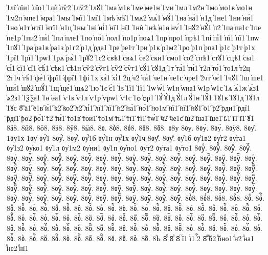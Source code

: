 {҆1лї
҆лїи1
҆лїо1
҆1лѝ
҆лѷ2
҆1лѷ2
҆1лꙋ1
҆1ма
҆м1в
҆1ме
҆ме1н
҆1ми
҆1мл
҆1м2н
҆1мо
҆мо1в
҆мо1н
҆1м2п
҆мпе1
҆мра1
҆1мы
҆1мї1
҆1мї1
҆1мѣ
҆мѣ̑1
҆1мѧ2
҆мѧ́1
҆мꙋ́1
҆1на
҆на́1
҆н1д
҆1не1
҆1ни
҆ни́1
҆1но
҆н1т
҆нтї1
҆нтї1
҆н1ц
҆1ны
҆1ні
҆ні́1
҆нї1
҆нї1
҆1нѝ
҆1нѣ
҆н1ѳ
҆нѵ́1
҆1нꙋ2
҆нꙋ́1
҆п2
҆1па
҆па1с
҆1пе
҆пе1р
҆1пи2
҆пи́1
҆1пл
҆пле1
҆1по
҆по́1
҆пол1
҆по1р
҆поѧ1
҆1пр
҆про1
҆прѣ1
҆1пі
҆пі́1
҆пї1
҆пї1
҆1пѡ
҆1пꙋ1
҆1ра
҆ра1в
҆ра1з
҆р1г2
҆р1д
҆рда1
҆1ре
҆ре1т
҆1ри
҆р1к
҆р1м2
҆1ро
҆р1п
҆рпа1
҆р1с
҆р1т
҆р1х
҆1рї1
҆1рї1
҆1рѡ1
҆1рѧ
҆рѧ́1
҆1рꙋ2
҆1с2
҆свѣ1
҆свѧ1
҆се2
҆ски1
҆смо1
҆со2
҆спѣ1
҆стꙋ1
҆сцѣ1
҆сы1
҆сі́1
҆сї1
҆сї1
҆сѣ́1
҆сѣк1
҆сѣ1н
҆сѷ2
҆сѷг1
҆сѷ2
҆сѷг1
҆сꙋ́1
҆сꙋ1д
҆1т
҆та́1
҆ти́1
҆т2л
҆то́1
҆то1л
҆т2ц
҆2т1ч
҆тѣ́1
҆фе́1
҆фрї1
҆фрї1
҆1фі
҆1х
҆ха́1
҆хі́1
҆2ц
҆ч2
҆ча́1
҆че1н
҆че1с
҆чре1
҆2чт
҆чє́1
҆1чꙋ1
҆1ш
҆ше1
҆ши́1
҆шꙋ2
҆шꙋ́1
҆1щ
҆ще́1
҆щѧ2
҆1ю
҆1є
҆є́1
҆1ѕ
҆1ї1
҆1ї1
҆1ѡ
҆ѡ́1
҆ѡ1н
҆ѡна1
҆ѡ1р
҆ѡ1с
҆1ѧ
҆ѧ́1ж
҆ѧ́з1
҆ѧ2з1
҆1ѯ
҆ѯа1
҆1ѳ
҆ѳа1
҆ѵ1к
҆ѵ1л
҆ѵ1р
҆ѵрѡ1
҆ѵ1с
҆1ѻ
҆ѻр1
҆1ꙋ́
҆ꙋ́1д
҆ꙋ́1л
҆ꙋ́1н
҆1ꙋ̑1
҆1ꙋ1в
҆1ꙋ1д
҆1ꙋ1л
҆1ꙋс
8҇
҇а1
҇е1в
҇и́1
҇к2
҇ко2
҇л2
҇лі́1
҇лї1
҇лї1
҇н2
҇на́1
҇но́1
҇но1м
҇нї1
҇нї1
҇нꙋ1
҇о1
҇р2
҇рди1
҇рдї1
҇рдї1
҇ро2
҇ро́1
҇т2
҇ти́1
҇то1в
҇тои1
҇то1м
҇ть1
҇тї1
҇тї1
҇тѡ́1
҇ч2
҇че1с
҇ш2
҇ша1
҇ше1
҇ь1
҇ї1
҇ї1
҇ꙋ1
8ӓ8.
8ӥ8.
8ӧ8.
8ӭ8.
8ӱ8.
8ӹ8.
8ᲂ.
8ᲂ̀8.
8ᲂ́8.
8ᲂ̈8.
8ᲂ̑8.
ᲂ8у
8ᲂу.
8ᲂу̀.
8ᲂу́.
8ᲂӱ8.
8ᲂу̑.
1ᲂу1х
1ᲂу҆
ᲂу҆̀1
8ᲂу҆̀.
8ᲂу҆́.
ᲂу҆́1б
ᲂу҆́1н
ᲂу҆́1х
ᲂу҆́1ч
8ᲂу҆̈.
8ᲂу҆̑.
ᲂу҆1б
ᲂу҆1в2
ᲂу҆г2
ᲂу҆га1
ᲂу҆1з2
ᲂу҆ко1
ᲂу҆1л
ᲂу҆1м2
ᲂу҆ни1
ᲂу҆1п
ᲂу҆по1
ᲂу҆т2
ᲂу҆та1
ᲂу҆то1
8ᲂуⷠ.
8ᲂуⷠ҇.
8ᲂуⷡ.
8ᲂуⷡ҇.
8ᲂуⷢ.
8ᲂуⷢ҇.
8ᲂуⷣ.
8ᲂуⷣ҇.
8ᲂуⷤ.
8ᲂуⷤ҇.
8ᲂуⷥ.
8ᲂуⷥ҇.
8ᲂуⷦ.
8ᲂуⷦ҇.
8ᲂуⷧ.
8ᲂуⷧ҇.
8ᲂуⷨ.
8ᲂуⷨ҇.
8ᲂуⷩ.
8ᲂуⷩ҇.
8ᲂуⷪ.
8ᲂуⷪ҇.
8ᲂуⷫ.
8ᲂуⷫ҇.
8ᲂуⷬ.
8ᲂуⷬ҇.
8ᲂуⷭ.
8ᲂуⷭ҇.
8ᲂуⷮ.
8ᲂуⷮ҇.
8ᲂуⷯ.
8ᲂуⷯ҇.
8ᲂуⷰ.
8ᲂуⷰ҇.
8ᲂуⷱ.
8ᲂуⷱ҇.
8ᲂуⷲ.
8ᲂуⷲ҇.
8ᲂуⷳ.
8ᲂуⷳ҇.
8ᲂуⷴ.
8ᲂуⷴ҇.
8ᲂуⷵ.
8ᲂуⷵ҇.
8ᲂуⷶ.
8ᲂуⷶ҇.
8ᲂуⷷ.
8ᲂуⷷ҇.
8ᲂуⷸ.
8ᲂуⷸ҇.
8ᲂуⷹ.
8ᲂуⷹ҇.
8ᲂуⷺ.
8ᲂуⷺ҇.
8ᲂуⷻ.
8ᲂуⷻ҇.
8ᲂуⷼ.
8ᲂуⷼ҇.
8ᲂуⷽ.
8ᲂуⷽ҇.
8ᲂуⷾ.
8ᲂуⷾ҇.
8ᲂуⷿ.
8ᲂуⷿ҇.
8ᲂуꙴ.
8ᲂуꙴ҇.
8ᲂуꙵ.
8ᲂуꙵ҇.
8ᲂуꙶ.
8ᲂуꙶ҇.
8ᲂуꙷ.
8ᲂуꙷ҇.
8ᲂуꙸ.
8ᲂуꙸ҇.
8ᲂуꙹ.
8ᲂуꙹ҇.
8ᲂуꙺ.
8ᲂуꙺ҇.
8ᲂуꙻ.
8ᲂуꙻ҇.
8ᲂу꙼.
8ᲂу꙼҇.
8ᲂу꙽.
8ᲂу꙽҇.
8ᲂ҆̀8.
8ᲂ҆́8.
8ᲂ҆̈8.
8ᲂ҆̑8.
8ᲂⷠ.
8ᲂⷠ҇.
8ᲂⷡ.
8ᲂⷡ҇.
8ᲂⷢ.
8ᲂⷢ҇.
8ᲂⷣ.
8ᲂⷣ҇.
8ᲂⷤ.
8ᲂⷤ҇.
8ᲂⷥ.
8ᲂⷥ҇.
8ᲂⷦ.
8ᲂⷦ҇.
8ᲂⷧ.
8ᲂⷧ҇.
8ᲂⷨ.
8ᲂⷨ҇.
8ᲂⷩ.
8ᲂⷩ҇.
8ᲂⷪ.
8ᲂⷪ҇.
8ᲂⷫ.
8ᲂⷫ҇.
8ᲂⷬ.
8ᲂⷬ҇.
8ᲂⷭ.
8ᲂⷭ҇.
8ᲂⷮ.
8ᲂⷮ҇.
8ᲂⷯ.
8ᲂⷯ҇.
8ᲂⷰ.
8ᲂⷰ҇.
8ᲂⷱ.
8ᲂⷱ҇.
8ᲂⷲ.
8ᲂⷲ҇.
8ᲂⷳ.
8ᲂⷳ҇.
8ᲂⷴ.
8ᲂⷴ҇.
8ᲂⷵ.
8ᲂⷵ҇.
8ᲂⷶ.
8ᲂⷶ҇.
8ᲂⷷ.
8ᲂⷷ҇.
8ᲂⷸ.
8ᲂⷸ҇.
8ᲂⷹ.
8ᲂⷹ҇.
8ᲂⷺ.
8ᲂⷺ҇.
8ᲂⷻ.
8ᲂⷻ҇.
8ᲂⷼ.
8ᲂⷼ҇.
8ᲂⷽ.
8ᲂⷽ҇.
8ᲂⷾ.
8ᲂⷾ҇.
8ᲂⷿ.
8ᲂⷿ҇.
8ᲂꙴ.
8ᲂꙴ҇.
8ᲂꙵ.
8ᲂꙵ҇.
8ᲂꙶ.
8ᲂꙶ҇.
8ᲂꙷ.
8ᲂꙷ҇.
8ᲂꙸ.
8ᲂꙸ҇.
8ᲂꙹ.
8ᲂꙹ҇.
8ᲂꙺ.
8ᲂꙺ҇.
8ᲂꙻ.
8ᲂꙻ҇.
8ᲂ꙼.
8ᲂ꙼҇.
8ᲂ꙽.
8ᲂ꙽҇.
8ᲆ
8ⷠ
8ⷡ
8ⷢ
ⷢї1
ⷢї1
ⷢ҇2
8ⷣ
ⷣб2
ⷣбно1
ⷣн2
ⷣна1
ⷣне2
ⷣнї1
}
